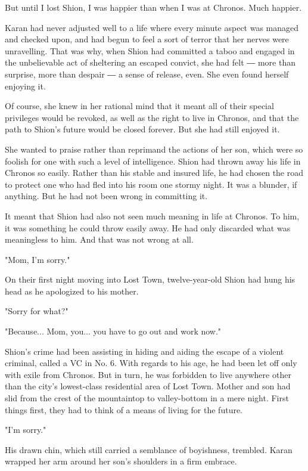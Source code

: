 But until I lost Shion, I was happier than when I was at Chronos. Much
happier.

Karan had never adjusted well to a life where every minute aspect was
managed and checked upon, and had begun to feel a sort of terror that
her nerves were unravelling. That was why, when Shion had committed a
taboo and engaged in the unbelievable act of sheltering an escaped
convict, she had felt ― more than surprise, more than despair ― a sense
of release, even. She even found herself enjoying it.

Of course, she knew in her rational mind that it meant all of their
special privileges would be revoked, as well as the right to live in
Chronos, and that the path to Shion's future would be closed forever.
But she had still enjoyed it.

She wanted to praise rather than reprimand the actions of her son, which
were so foolish for one with such a level of intelligence. Shion had
thrown away his life in Chronos so easily. Rather than his stable and
insured life, he had chosen the road to protect one who had fled into
his room one stormy night. It was a blunder, if anything. But he had not
been wrong in committing it.

It meant that Shion had also not seen much meaning in life at Chronos.
To him, it was something he could throw easily away. He had only
discarded what was meaningless to him. And that was not wrong at all.

"Mom, I'm sorry."

On their first night moving into Lost Town, twelve-year-old Shion had
hung his head as he apologized to his mother.

"Sorry for what?"

"Because... Mom, you... you have to go out and work now."

Shion's crime had been assisting in hiding and aiding the escape of a
violent criminal, called a VC in No. 6. With regards to his age, he had
been let off only with exile from Chronos. But in turn, he was forbidden
to live anywhere other than the city's lowest-class residential area of
Lost Town. Mother and son had slid from the crest of the mountaintop to
valley-bottom in a mere night. First things first, they had to think of
a means of living for the future.

"I'm sorry."

His drawn chin, which still carried a semblance of boyishness, trembled.
Karan wrapped her arm around her son's shoulders in a firm embrace.


